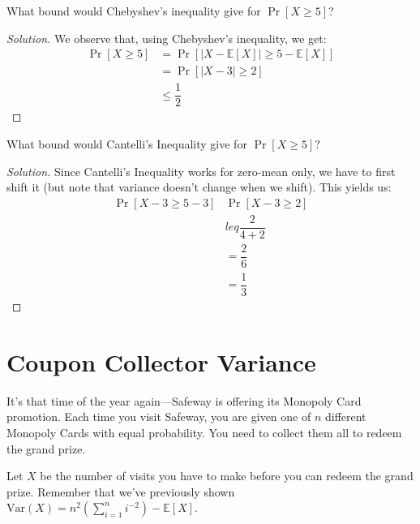 \documentclass{article}
\newenvironment{solution}{\begin{proof}[Solution]}{\end{proof}}
\newcommand{\E}{\mathbb{E}}
\newcommand{\var}{\mathrm{Var}}
\begin{document}
\begin{hw}
	What bound would Chebyshev's inequality give for $\Pr[X \ge 5]$?
\end{hw}
\begin{solution}
	We observe that, using Chebyshev's inequality, we get:
	\begin{align*}
		\Pr[X \geq 5] &= \Pr[\lvert X - \E[X] \rvert \geq 5 - \E[X]] \\
		&= \Pr[\lvert X - 3 \rvert \geq 2] \\
		&\leq \dfrac{1}{2}
	\end{align*}
\end{solution}

\begin{hw}
	What bound would Cantelli's Inequality give for $\Pr[X \ge 5]$? 
\end{hw}
\begin{solution}
	Since Cantelli's Inequality works for zero-mean only, we have to first shift it (but note that variance doesn't change when we shift). This yields us:
	\begin{align*}
		\Pr[X - 3 \geq 5 - 3] & \Pr[X - 3 \geq 2] \\
		&leq \dfrac{2}{4 + 2} \\
		&= \dfrac{2}{6} \\
		&= \dfrac{1}{3}
	\end{align*}
\end{solution}

\newpage

\section{Coupon Collector Variance}
It's that time of the year again---Safeway is offering its Monopoly Card promotion. Each time you visit Safeway, you are given one of $n$ different Monopoly Cards with equal probability. You need to collect them all to redeem the grand prize.

Let $X$ be the number of visits you have to make before you can redeem the grand prize. Remember that we've previously shown $\var(X) = n^2\left(\sum_{i=1}^n i^{-2}\right) - \E[X]$.
\end{document}
